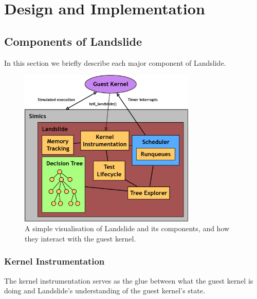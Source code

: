 \chapter{Design and Implementation}
\label{sec:design}

\section{Components of Landslide}

In this section we briefly describe each major component of Landslide.

\begin{figure}[h]
	\centering
	\includegraphics[width=0.75\textwidth]{landslide.png}
	\caption{A simple visualisation of Landslide and its components, and how they interact with the guest kernel.}
	\label{fig:landslide}
\end{figure}

\subsection{Kernel Instrumentation}
\label{sec:components-kern}

The kernel instrumentation serves as the glue between what the guest kernel is doing and Landslide's understanding of the guest kernel's state.

